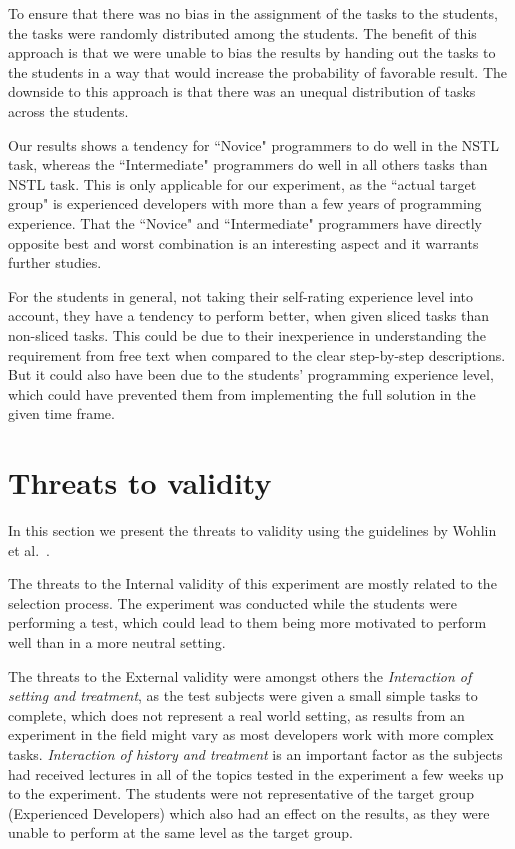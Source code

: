 \documentclass{sig-alternate-05-2015}
\begin{document}
To ensure that there was no bias in the assignment of the tasks to the students, the tasks were randomly distributed among the students. The benefit of this approach is that we were unable to bias the results by handing out the tasks to the students in a way that would increase the probability of favorable result. The downside to this approach is that there was an unequal distribution of tasks across the students.

Our results shows a tendency for ``Novice" programmers to do well in the NSTL task, whereas the ``Intermediate" programmers do well in all others tasks than NSTL task. This is only applicable for our experiment, as the ``actual target group" is experienced developers with more than a few years of programming experience. That the ``Novice" and ``Intermediate" programmers have directly opposite  best and worst combination is an interesting aspect and it warrants  further studies.

For the students in general, not taking their self-rating experience level into account, they have a tendency to perform better, when given sliced tasks than non-sliced tasks. This could be due to their inexperience in understanding the requirement from free text when compared to the clear step-by-step descriptions. But it could also have been due to the students' programming experience level, which could have prevented them from implementing the full solution in the given time frame.

\section{Threats to validity}
\label{sec:Threats to validity}
In this section we present the threats to validity using the guidelines by Wohlin et al.~\cite{wohlin1}.

The threats to the Internal validity of this experiment are mostly related to the selection process. The experiment was conducted while the students were performing a test, which could lead to them being more motivated to perform well than in a more neutral setting.

The threats to the External validity were amongst others the \textit{Interaction of setting and treatment}, as the test subjects were given a small simple tasks to complete, which does not represent a real world setting, as results from an experiment in the field might vary as most developers work with more complex tasks. \textit{Interaction of history and treatment} is an important factor as the subjects had received lectures in all of the topics tested in the experiment a few weeks up to the experiment. The students were not representative of the target group (Experienced Developers) which also had an effect on the results, as they were unable to perform at the same level as the target group.
\end{document}

